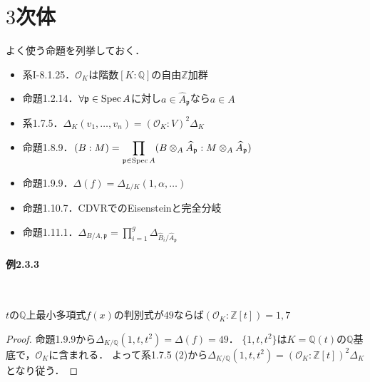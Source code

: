 \section{$3$次体}
よく使う命題を列挙しておく．
\begin{itemize}
  \item 系I-8.1.25．$\mathcal{O}_K$は階数$[K:\mathbb{Q}]$の自由$\mathbb{Z}$加群
  \item 命題1.2.14．$\forall\mathfrak{p} \in \operatorname{Spec} A$に対し$a \in \widehat{A}_\mathfrak{p}$なら$a \in A$
  \item 系1.7.5．$\varDelta_K(v_1, \ldots, v_n) = (\mathcal{O}_K:V)^2 \varDelta_K$
  \item 命題1.8.9．$\displaystyle(B:M) = \prod_{\mathfrak{p} \in \operatorname{Spec} A} (B \otimes_A \widehat{A}_\mathfrak{p}:M \otimes_A \widehat{A}_\mathfrak{p})$
  \item 命題1.9.9．$\varDelta(f) = \varDelta_{L/K}(1, \alpha, \ldots)$
  \item 命題1.10.7．CDVRでのEisensteinと完全分岐
  \item 命題1.11.1．$\varDelta_{B/A, \mathfrak{p}} = \displaystyle \prod_{i=1}^g \varDelta_{\widehat{B}_i/\widehat{A}_\mathfrak{p}}$
\end{itemize}

\paragraph{例2.3.3}~
\begin{screen}
  $t$の$\mathbb{Q}$上最小多項式$f(x)$の判別式が$49$ならば$(\mathcal{O}_K:\mathbb{Z}[t])=1, 7$
\end{screen}
\begin{proof}
  命題1.9.9から$\varDelta_{K/\mathbb{Q}}(1, t, t^2)=\varDelta(f)=49$．
  $\{1, t, t^2\}$は$K=\mathbb{Q}(t)$の$\mathbb{Q}$基底で，$\mathcal{O}_K$に含まれる．
  よって系1.7.5 (2)から$\varDelta_{K/\mathbb{Q}}(1, t, t^2)=(\mathcal{O}_K:\mathbb{Z}[t])^2\varDelta_K$となり従う．
\end{proof}

